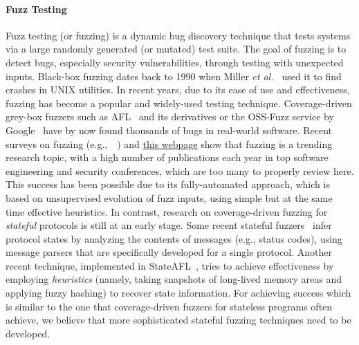 \documentclass[11pt]{article}
\newcommand{\mycomment}[1]{}
\newcommand{\FIX}[1]{\textcolor{red}{\textbf{#1}}}
\newcommand{\UNREVISED}[1]{\textcolor{DarkGrey}{#1}}
\newcommand{\system}[1]{\mbox{\textsf{#1}}}
\newcommand{\myparagraph}{}
\let\myparagraph=\paragraph
\renewcommand{\paragraph}{\vspace{-3mm}\myparagraph}
\newcommand{\eg}{e.\/g.,\ }
\newcommand{\etal}{\textit{et al.}}
\begin{document}
\paragraph{Fuzz Testing}
Fuzz testing (or fuzzing) is a dynamic bug discovery technique that tests
systems via a large randomly generated (or mutated) test suite. The goal of
fuzzing is to detect bugs, especially security vulnerabilities, through
testing with unexpected inputs. Black-box fuzzing dates back to 1990 when
Miller \etal~\cite{Fuzz@CACM-90} used it to find crashes in UNIX utilities. In
recent years, due to its ease of use and effectiveness, fuzzing has become a
popular and widely-used testing technique. Coverage-driven grey-box fuzzers
such as \system{AFL}~\cite{AFL} and its derivatives or the OSS-Fuzz service by
Google~\cite{OSS-Fuzz@USENIX-17} have by now found thousands of bugs in
real-world software. Recent surveys on fuzzing
(\eg~\cite{FuzzingSurvey@TSE-21,FuzzingRoadmap@CompSurveys-22}) and
\href{https://wcventure.github.io/FuzzingPaper/}{this webpage} show that
fuzzing is a trending research topic, with a high number of publications each
year in top software engineering and security conferences, which are too many
to properly review here.
%
This success has been possible due to its fully-automated approach, which is
based on unsupervised evolution of fuzz inputs, using simple but at the same
time effective heuristics. In contrast, research on coverage-driven fuzzing
for \emph{stateful} protocols is still at an early stage.
%
Some recent stateful fuzzers~\cite{AFLNET@ICST-20,Snipuzz@CCS-21} infer
protocol states by analyzing the contents of messages (e.g., status codes),
using message parsers that are specifically developed for a single protocol.
Another recent technique, implemented in
\system{StateAFL}~\cite{StateAFL@ESE-22}, tries to achieve effectiveness by
employing \emph{heuristics} (namely, taking snapshots of long-lived memory
areas and applying fuzzy hashing) to recover state information.
%
For achieving success which is similar to the one that coverage-driven fuzzers
for stateless programs often achieve, we believe that more sophisticated
stateful fuzzing techniques need to be developed.


\mycomment{
\section{Significance and Scientific Novelty} \label{sec:significance}
\FIX{No text here yet :-(}

\UNREVISED{However, it may be possibe to skip this section if we manage to have short ``Significance'' paragraphs for each of the six tasks in the next section.}
}
\end{document}
